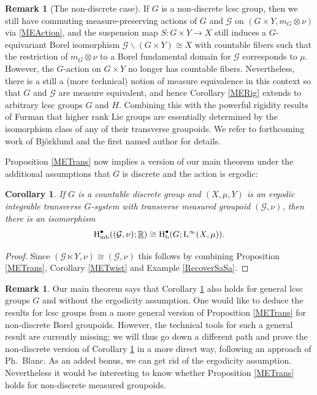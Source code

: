 \documentclass[11pt, oneside]{amsart}
\newtheorem{cor}[lemma]{Corollary}
\theoremstyle{definition}
\newtheorem{remark}[lemma]{Remark}
\theoremstyle{remark}
\theoremstyle{TheoremNum}
\newcommand{\Hb}{\textup{H}_{\textup{b}}}
\newcommand{\Hmb}{\textup{H}_{\textup{mb}}}
\newcommand{\Linf}{\mathrm{L}^{\infty}}
\newcommand{\cG}{\mathcal{G}}
\newcommand{\bR}{\mathbb{R}}
\begin{document}
\begin{remark}[The non-discrete case] If $G$ is a non-discrete lcsc group, then we still have commuting measure-preserving actions of $G$ and $\cG$ on $(G \times Y, m_G \otimes \nu)$ via  \eqref{MEAction}, and the suspension map $S: G \times Y \to X$ still induces a $G$-equivariant Borel isomorphism $\cG \backslash (G \times Y) \cong X$ with countable fibers such that the restriction of $m_G \otimes \nu$ to a Borel fundamental domain for $\cG$ corresponds to $\mu$. However, the $G$-action on $G \times Y$ no longer has countable fibers. Nevertheless, there is a still a (more technical) notion of measure equivalence in this context so that $G$ and $\cG$ are measure equivalent, and hence Corollary \ref{MERig} extends to arbitrary lcsc groups $G$ and $H$. Combining this with the powerful rigidity results of Furman \cite{Furman99} that higher rank Lie groups are essentially determined by the isomorphism class of any of their transverse groupoids. We refer to forthcoming work of Bj\"orklund and the first named author for details.
\end{remark}
Proposition \ref{METrans} now implies a version of our main theorem under the additional assumptions that $G$ is discrete and the action is ergodic:
\begin{cor}\label{MainThmDiscrete} If $G$ is a countable discrete group and $(X, \mu, Y)$ is an ergodic integrable transverse $G$-system with transverse measured groupoid $(\cG, \nu)$, then there is an isomorphism
\[
\Hmb^\bullet((\mathcal{G}, \nu); \underline{\bR}) \cong \Hb^\bullet(G; \Linf(X, \mu)).
\]
\end{cor}
\begin{proof} Since $(\cG \ltimes Y,  \nu) \cong (\cG, \nu)$ this follows by combining Proposition \ref{METrans}, Corollary \ref{METwist} and Example \ref{RecoverSaSa}.
\end{proof}
\begin{remark}
Our main theorem says that Corollary \ref{MainThmDiscrete} also holds for general lcsc groups $G$ and without the ergodicity assumption. One would like to deduce the results for lcsc groups from a more general version of Proposition \ref{METrans} for non-discrete Borel groupoids. However, the technical tools for such a general result are currently missing; we will thus go down a different path and prove the non-discrete version of Corollary \ref{MainThmDiscrete} in a more direct way, following an approach of Ph.\ Blanc. As an added bonus, we can get rid of the ergodicity assumption. Nevertheless it would be interesting to know whether Proposition \ref{METrans} holds for non-discrete measured groupoids.
\end{remark}
\end{document}
